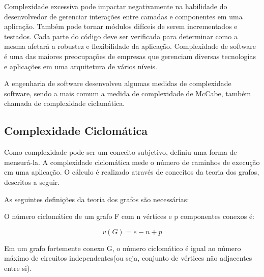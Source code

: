 Complexidade excessiva pode impactar negativamente na habilidade do desenvolvedor de gerenciar interações entre camadas e componentes em uma aplicação. Também pode tornar módulos difíceis de serem incrementados e testados. Cada parte do código deve ser verificada para determinar como a mesma afetará a robustez e flexibilidade da aplicação. Complexidade de software é uma das maiores preocupações de empresas que gerenciam diversas tecnologias e aplicações em uma arquitetura de vários níveis.

A engenharia de software desenvolveu algumas medidas de complexidade software, sendo a mais comum a medida de complexidade de McCabe, também chamada de complexidade ciclamática. 

\subsection{ Complexidade Ciclomática }

Como complexidade pode ser um conceito subjetivo, \cite{mccabe1976complexity} definiu uma forma de mensurá-la. A complexidade ciclomática mede o número de caminhos de execução em uma aplicação. O cálculo é realizado através de conceitos da teoria dos grafos, descritos a seguir.

As seguintes definições da teoria dos grafos são necessárias:
\begin{definition}
O número ciclomático de um grafo F com n vértices e p componentes conexos é:
\end{definition}
\[ v(G) = e - n + p \]
\begin{theorem}
Em um grafo fortemente conexo G, o número ciclomático é igual ao número máximo de circuitos independentes(ou seja, conjunto de vértices não adjacentes entre si). 
\end{theorem}


